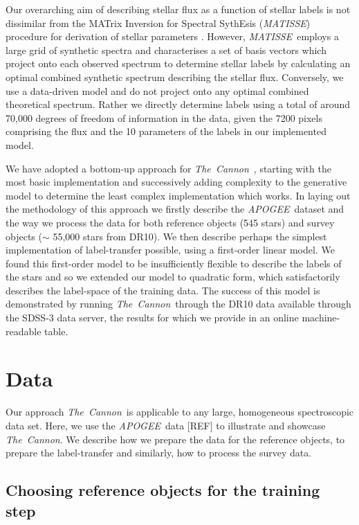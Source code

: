 \documentclass[12pt, preprint]{aastex}
\newcommand{\tc}{\textsl{The~Cannon}}
\newcommand{\apogee}{\textsl{APOGEE}}
\newcommand{\matisse}{\textsl{MATISSE}}
\begin{document}
Our overarching aim of describing stellar flux as a function of stellar labels is not dissimilar from the MATrix Inversion for Spectral SythEsis (\matisse) procedure for derivation of stellar parameters \citep{RB2006}. 
However, \matisse\ employs a large grid of synthetic spectra and characterises a set of basis vectors which project onto each observed spectrum to determine stellar labels by calculating an optimal combined synthetic spectrum describing the stellar flux. 
Conversely, we use a data-driven model and do not project onto any optimal combined theoretical spectrum. 
Rather we directly determine labels using a total of around 70,000 degrees of freedom of information in the data, given the 7200 pixels comprising the flux and the 10 parameters of the labels in our implemented model. 

We have adopted a bottom-up approach for \tc\ , starting with the most basic implementation and successively adding complexity to the generative model to determine the least complex implementation which works.  
In laying out the methodology of this approach we firstly describe the \apogee\ dataset and the way we process the data for both reference objects (545 stars) and survey objects ($\sim$ 55,000 stars from DR10). 
We then describe perhaps the simplest implementation of label-transfer possible, using a first-order linear model. We found this first-order model to be insufficiently flexible to describe the labels of the stars and so we extended our model to quadratic form, which satisfactorily describes the label-space of the training data.
The success of this model is demonstrated by running \tc\ through the DR10 data available through the SDSS-3 data server, the results for which we provide in an online machine-readable table. %

\section{Data}
Our approach \tc \ is applicable to any large, homogeneous spectroscopic data set. Here, we use the \apogee\ data [REF] to illustrate and showcase \tc . 
We describe how we prepare the data for the reference objects, to prepare the label-transfer and similarly, how to process the survey data.

\subsection{Choosing reference objects for the training step}
\end{document}
